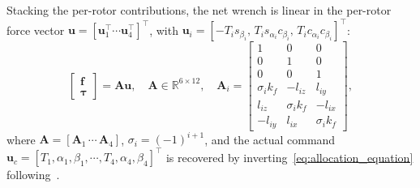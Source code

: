 \documentclass[letterpaper, 10 pt, conference]{ieeeconf}  %
\begin{document}


Stacking the per-rotor contributions, the net wrench is linear in the
per-rotor force vector $\boldsymbol{u}=[\boldsymbol{u}_1^\top \cdots \boldsymbol{u}_4^\top]^\top$,
with $\boldsymbol{u}_i=[-T_i s_{\beta_i},\, T_i s_{\alpha_i}c_{\beta_i},\, T_i c_{\alpha_i}c_{\beta_i}]^\top$:
\begin{equation}
\label{eq:allocation_equation}
\begin{bmatrix}\boldsymbol{f}\\ \boldsymbol{\tau}\end{bmatrix}
= \boldsymbol{A}\boldsymbol{u},\quad \boldsymbol{A}\in\mathbb{R}^{6\times12},\quad
\boldsymbol{A}_i=
\begin{bmatrix}
1&0&0\\ 0&1&0\\ 0&0&1\\
\sigma_i k_f & -l_{iz} & l_{iy}\\
l_{iz} & \sigma_i k_f & -l_{ix}\\
-l_{iy} & l_{ix} & \sigma_i k_f
\end{bmatrix},
\end{equation}
where $\boldsymbol{A}=[\boldsymbol{A}_1\,\cdots\,\boldsymbol{A}_4]$, $\sigma_i=(-1)^{i+1}$, and the actual
command $\boldsymbol{u}_c=[T_1,\alpha_1,\beta_1,\cdots,T_4,\alpha_4,\beta_4]^\top$ is recovered
by inverting~\eqref{eq:allocation_equation} following~\cite{lee2025autonomous}.
\end{document}
